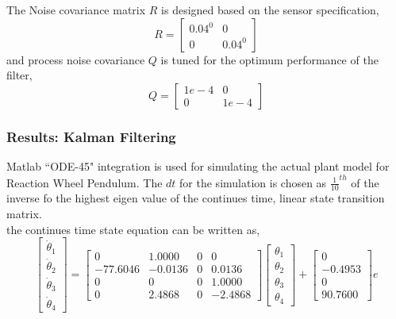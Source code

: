 \documentclass[a4paper]{article}
\begin{document}
The Noise covariance matrix $R$ is designed based on the sensor specification,
\begin{equation}
R = \left[\begin{array}{cc}
0.04^0&0  \\ 
0& 0.04^0
\end{array}\right] 
\end{equation}
and process noise covariance $Q$ is tuned for the optimum performance of the filter,
\begin{equation}
Q = \left[\begin{array}{cc}
1e-4&0  \\ 
0& 1e-4
\end{array}\right] 
\end{equation}
\subsubsection{Results: Kalman Filtering}
Matlab ``ODE-45" integration is used for simulating the actual plant model for Reaction Wheel Pendulum. The $dt$ for the simulation is chosen as $\frac{1}{10}^{th}$ of the inverse fo the highest eigen value of the continues time, linear state transition matrix.\\
the continues time state equation can be written as,
\begin{equation}
\left[\begin{array}{c}
\dot \theta_1\\ 
\dot \theta_2\\ 
\dot \theta_3\\ 
\dot \theta_4
\end{array}\right] = \left[\begin{array}{cccc}
         0  &  1.0000    &     0   &      0\\
         -77.6046 &  -0.0136   &      0  &  0.0136\\
         0    &     0    &     0   & 1.0000\\
         0  &  2.4868   &      0  & -2.4868
\end{array} \right]\left[\begin{array}{c}
\theta_1\\ 
\theta_2\\ 
\theta_3\\ 
\theta_4
\end{array}\right]+\left[\begin{array}{c}
0\\
-0.4953\\
0\\
90.7600
\end{array} \right]e 
\end{equation}\\
\end{document}
